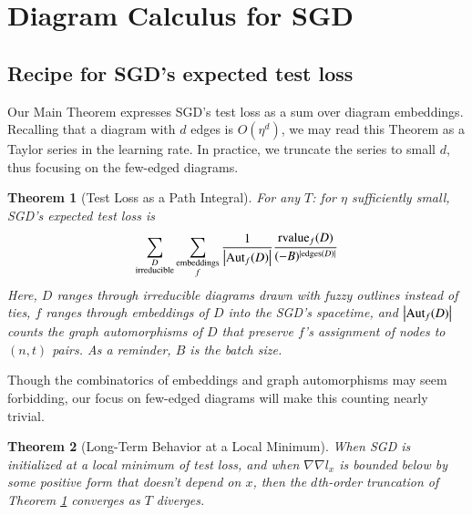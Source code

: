 \documentclass{article}
\theoremstyle{plain}
\newtheorem{thm}{Theorem}
\theoremstyle{definition}
\newcommand{\wabs}[1]{\left|#1\right|}
\newcommand{\Aut}{\text{\textnormal{Aut}}}
\newcommand{\rvalue}{\text{\textnormal{rvalue}}}
\newcommand{\edges}{\text{\textnormal{edges}}}
\begin{document}
\section{Diagram Calculus for SGD} \label{sect:calculus}

    \subsection{Recipe for SGD's expected test loss}
               
        Our Main Theorem expresses SGD's test loss as a sum over diagram
        embeddings.  Recalling that a diagram with $d$ edges is $O(\eta^d)$,
        we may read this Theorem as a Taylor series in the learning rate.  In
        practice, we truncate the series to small $d$, thus focusing on the
        few-edged diagrams.
        \begin{thm}[Test Loss as a Path Integral] \label{thm:resum}
            For any $T$: for $\eta$ sufficiently small, SGD's expected test
            loss is
            \begin{equation*} \label{eq:resum}
                \sum_{\substack{D \\ \text{irreducible}}}
                \sum_{\substack{\text{embeddings} \\ f}}
                \frac{1}{\wabs{\Aut_f(D)}}
                \frac{{\rvalue_f}(D)}{(-B)^{|\edges(D)|}}
            \end{equation*}
            Here, $D$ ranges through irreducible diagrams drawn with fuzzy
            outlines instead of ties, $f$ ranges through embeddings of $D$ into
            the SGD's spacetime, and $\wabs{\Aut_f(D)}$ counts the graph
            automorphisms of $D$ that preserve $f$'s assignment of nodes to
            $(n,t)$ pairs.  As a reminder, $B$ is the batch size. 
        \end{thm}
        Though the combinatorics of embeddings and graph automorphisms may seem
        forbidding, our focus on few-edged diagrams will make this counting
        nearly trivial.

 
        \begin{thm}[Long-Term Behavior at a Local Minimum] \label{thm:converge}
            When SGD is initialized at a local minimum of test loss, and when
            $\nabla\nabla l_x$ is bounded below by some positive form that
            doesn't depend on $x$, then the $d$th-order truncation of Theorem 
            \ref{thm:resum} converges as $T$ diverges.
        \end{thm}
\end{document}
